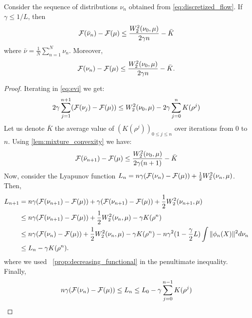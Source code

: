 \begin{theorem}\label{th:rates_mmd}
	Consider the sequence of distributions $\nu_n$ obtained from \cref{eq:discretized_flow}. If $\gamma \leq 1/L$, then
	\begin{align}
{{\mathcal F}}(\bar{\nu}_{n})-{{\mathcal F}}(\mu)\leq  \frac{W_2^2(\nu_0,\mu)}{2 \gamma n} -\bar{K}
\end{align}
where $\bar{\nu}=\frac{1}{N}\sum_{n=1}^N \nu_n$. Moreover, 
\begin{align}
{{\mathcal F}}(\nu_n)-{{\mathcal F}}(\mu)\leq  \frac{W_2^2(\nu_0,\mu)}{2 \gamma n} -\bar{K}.
\end{align}
\end{theorem}
\begin{proof}
Iterating in \cref{eq:evi} we get:
\begin{align}
	2\gamma \sum_{j=1}^{n+1} ({{\mathcal F}}(\nu_{j}) - {{\mathcal F}}(\mu)) \leq W_2^2(\nu_0,\mu) - 2\gamma \sum_{j=0}^n K(\rho^j)
\end{align}
Let us denote $\bar{K}$ the average value of $(K(\rho^j))_{0\leq j \leq n}$ over iterations from $0$ to $n$. Using \cref{lem:mixture_convexity} we have:
\begin{align}
{{\mathcal F}}(\bar{\nu}_{n+1})-{{\mathcal F}}(\mu)\leq  \frac{W_2^2(\nu_0,\mu)}{2 \gamma (n+1)} -\bar{K}
\end{align}
Now, consider the Lyapunov function $L_n = n \gamma ({{\mathcal F}}(\nu_n) - {{\mathcal F}}(\mu)) + \frac12 W_2^2(\nu_n,\mu)$. Then,
\begin{align*}
    L_{n+1} &= n\gamma({{\mathcal F}}(\nu_{n+1}) - {{\mathcal F}}(\mu)) + \gamma({{\mathcal F}}(\nu_{n+1}) - {{\mathcal F}}(\mu)) + \frac12 W_2^2(\nu_{n+1},\mu)\\
    &\leq n\gamma({{\mathcal F}}(\nu_{n+1}) - {{\mathcal F}}(\mu)) + \frac12 W_2^2(\nu_n,\mu)-\gamma K(\rho^n)\\
    &\leq n\gamma({{\mathcal F}}(\nu_{n}) - {{\mathcal F}}(\mu)) + \frac12 W_2^2(\nu_n,\mu)-\gamma K(\rho^n) -n\gamma^2 (1-\frac{\gamma}{2}L )\int \Vert \phi_n(X)\Vert^2 d\nu_n \\
    &\leq  L_n - \gamma K(\rho^n).
\end{align*}
where we used ~\cref{prop:decreasing_functional} in the penultimate inequality.
Finally, 
\begin{equation}
    n\gamma ({{\mathcal F}}(\nu_{n}) - {{\mathcal F}}(\mu)) \leq L_n \leq L_0 -\gamma \sum_{j = 0}^{n-1} K(\rho^j)
\end{equation}
\end{proof}
